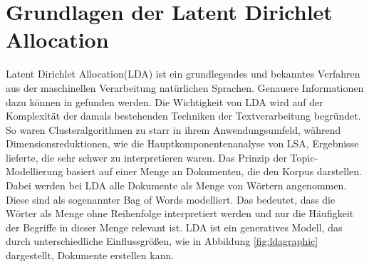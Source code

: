 \documentclass[german,version-2020-11]{uzl-thesis}
\begin{document}


\section{Grundlagen der Latent Dirichlet Allocation }
Latent Dirichlet Allocation(LDA) ist ein grundlegendes und bekanntes Verfahren aus der maschinellen Verarbeitung natürlichen Sprachen. Genauere Informationen dazu können in \cite{a0} gefunden werden. Die Wichtigkeit von LDA wird auf der Komplexität der damals bestehenden Techniken der Textverarbeitung begründet. So waren Clusteralgorithmen zu starr in ihrem Anwendungsumfeld, während Dimensionsreduktionen, wie die Hauptkomponentenanalyse von LSA, Ergebnisse lieferte, die sehr schwer zu interpretieren waren. Das Prinzip der Topic-Modellierung basiert auf einer Menge an Dokumenten, die den Korpus darstellen. Dabei werden bei LDA alle Dokumente als Menge von Wörtern angenommen. Diese sind als sogenannter Bag of Words modelliert. Das bedeutet, dass die Wörter als Menge ohne Reihenfolge interpretiert werden und nur die Häufigkeit der Begriffe in dieser Menge relevant ist. LDA ist ein generatives Modell, das durch unterschiedliche Einflussgrößen, wie in Abbildung \ref{fig:ldagraphic} dargestellt, Dokumente erstellen kann. \\
\end{document}
